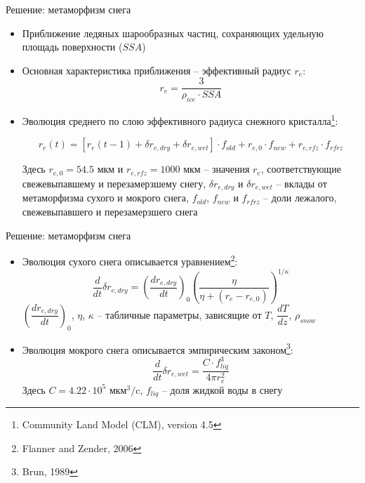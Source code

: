 \documentclass[unicode]{beamer}
\begin{document}
\begin{frame}{Решение: метаморфизм снега}

\scriptsize

\begin{itemize}
        \item Приближение ледяных шарообразных частиц, сохраняющих удельную площадь поверхности ($SSA$) 

        \item Основная характеристика приближения -- эффективный радиус $r_e$:
            \[ r_e = \dfrac{3} {\rho_{ice} \cdot SSA} \label{sys} \]
        \item Эволюция среднего по слою эффективного радиуса снежного кристалла\footnote{\scriptsize Community Land Model (CLM), version 4.5}:
        \footnotesize
        \begin{block}{}  
            \[ r_e(t) = [r_e (t - 1) + \delta r_{e , dry} + \delta r_{e , wet} ] \cdot f_{old} + r_{e ,0} \cdot f_{new} + r_{e , rfz} \cdot f_{rfrz} \]
        \end{block}    
        \scriptsize
        Здесь $ r_{e ,0} = 54.5 $ мкм и $r_{e , rfz} = 1000 $ мкм -- значения $r_e$, соответствующие свежевыпавшему и перезамерзшему снегу, $\delta r_{e , dry}$ и $\delta r_{e , wet}$ -- вклады от метаморфизма сухого и мокрого снега, $f_{old}$, $f_{new}$ и $f_{rfrz}$ -- доли лежалого, свежевыпавшего и перезамерзшего снега
\end{itemize}



\end{frame}



\begin{frame}{Решение: метаморфизм снега}

\footnotesize

\begin{itemize}
    \item Эволюция сухого снега описывается уравнением\footnote{\scriptsize Flanner and Zender, 2006}:
    \footnotesize
    \[ \dfrac{d}{dt} \delta r_{e , dry} = {\left( \dfrac{dr_{e , dry}}{dt} \right)}_0 \left(\dfrac{\eta}{\eta + (r_e - r_{e, 0})}\right)^{1 / \kappa} \]
    ${\left( \dfrac{dr_{e , dry}}{dt} \right)}_0$, $\eta$, $\kappa$ -- табличные параметры, зависящие от $T$, $\dfrac{dT}{dz}$, $\rho_{snow}$

    \item Эволюция мокрого снега описывается эмпирическим законом\footnote{\scriptsize Brun, 1989}:
    \footnotesize
    \[ \dfrac{d}{dt} \delta r_{e , wet} = \dfrac{C \cdot f_{liq}^3} {4 \pi r_{e}^2} \]
    Здесь $C = 4.22 \cdot 10^{5}$ мкм$^3/$c, $f_{liq}$ -- доля жидкой воды в снегу
\end{itemize}

\end{frame}
\end{document}
